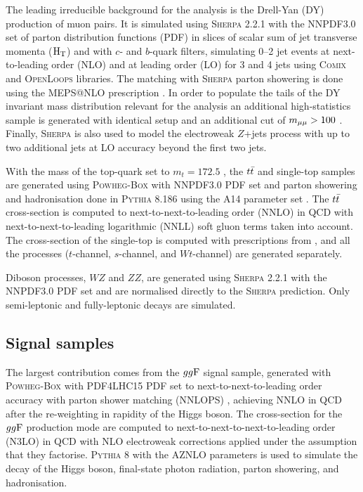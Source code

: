 The leading irreducible background for the analysis is the
Drell-Yan (DY) production of muon pairs. It is simulated using
\textsc{Sherpa} 2.2.1 with the NNPDF3.0 set of parton
distribution functions (PDF) \cite{Ball:2014uwa} in slices of
scalar sum of jet transverse momenta ($\text{H}_\text{T}$) and with $c$- and $b$-quark filters, simulating 0--2
jet events at next-to-leading order (NLO) and at leading order
(LO) for 3 and 4 jets using \textsc{Comix} \cite{Gleisberg:2008fv}
and \textsc{OpenLoops} \cite{Cascioli:2011va, Denner:2016kdg}
libraries. The matching with \textsc{Sherpa} parton showering
\cite{Schumann:2007mg} is done using the MEPS@NLO prescription
\cite{Catani:2001cc, Hoeche:2012yf, Hoeche:2011fd}.
In order to populate the tails of the
DY invariant mass distribution relevant for the analysis an
additional high-statistics sample is generated with identical
setup and an additional cut of $m_{\mu\mu} > 100$ \GeV. Finally, 
\textsc{Sherpa} is also used to model the electroweak $Z$+jets
process with up to two additional jets at LO accuracy beyond
the first two jets.

With the mass of the top-quark set to $m_t = 172.5$ \GeV, the
$t\bar{t}$ and single-top samples are generated using
\textsc{Powheg-Box} \cite{powheg, Frixione_2007, Alioli_2010}
with NNPDF3.0 PDF set and parton showering and hadronisation
done in \textsc{Pythia} 8.186 using the A14 parameter set
\cite{ATL-PHYS-PUB-2014-021}. The $t\bar{t}$ cross-section is
computed to next-to-next-to-leading order (NNLO) in
QCD with next-to-next-to-leading logarithmic
(NNLL) soft gluon terms taken into account. The cross-section
of the single-top is computed with prescriptions from
\cite{Kidonakis:2011wy, Kidonakis:2010ux}, and all the processes
($t$-channel, $s$-channel, and $Wt$-channel) are generated
separately.

Diboson processes, $WZ$ and $ZZ$, are generated using
\textsc{Sherpa} 2.2.1 with the NNPDF3.0 PDF set and are normalised
directly to the \textsc{Sherpa} prediction. Only semi-leptonic
and fully-leptonic decays are simulated.

\subsection{Signal samples}

The largest contribution comes from the $gg\text{F}$ signal sample,
generated with \textsc{Powheg-Box} with PDF4LHC15 PDF set
to next-to-next-to-leading order accuracy with parton shower matching
(NNLOPS) \cite{Hamilton:2013fea}, achieving NNLO in QCD after
the re-weighting in rapidity of the Higgs boson. The cross-section
for the $gg\text{F}$ production mode are computed to
next-to-next-to-next-to-leading order (N3LO) \cite{Anastasiou:2016cez}
in QCD with NLO electroweak corrections applied
\cite{Aglietti:2004nj, Actis:2008ug} under the assumption that
they factorise. \textsc{Pythia} 8 with the AZNLO parameters
\cite{Aad:2014xaa} is used to simulate the decay
of the Higgs boson, final-state photon radiation, parton
showering, and hadronisation. 

